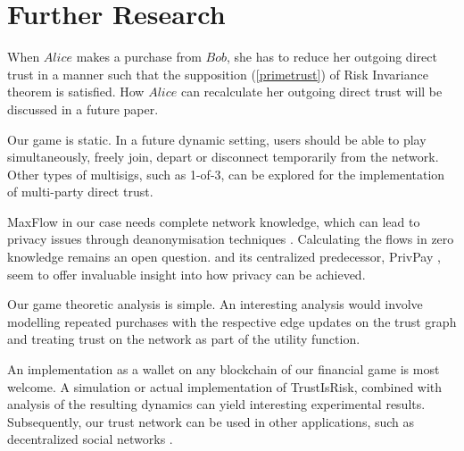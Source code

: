 \section{Further Research}

    When $Alice$ makes a purchase from $Bob$, she has to reduce her outgoing direct trust in a manner such that the
    supposition (\ref{primetrust}) of Risk Invariance theorem is satisfied. How $Alice$ can recalculate her outgoing
    direct trust will be discussed in a future paper.

    Our game is static. In a future dynamic setting, users should be able to play simultaneously, freely join, depart or
    disconnect temporarily from the network. Other types of multisigs, such as 1-of-3, can be explored for the
    implementation of multi-party direct trust.

    MaxFlow in our case needs complete network knowledge, which can lead to privacy issues through deanonymisation
    techniques \cite{deanonymisation}. Calculating the flows in zero knowledge remains an open question.
    \cite{silentwhispers} and its centralized predecessor, PrivPay \cite{privpay}, seem to offer invaluable insight into how
    privacy can be achieved.

    Our game theoretic analysis is simple. An interesting analysis would involve modelling repeated purchases with the
    respective edge updates on the trust graph and treating trust on the network as part of the utility function.

    An implementation as a wallet on any blockchain of our financial game is most welcome. A simulation or actual
    implementation of TrustIsRisk, combined with analysis of the resulting dynamics can yield interesting experimental
    results. Subsequently, our trust network can be used in other applications, such as decentralized social networks
    \cite{synereo}.

